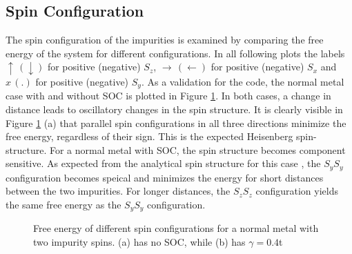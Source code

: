 \subsection{Spin Configuration}
The spin configuration of the impurities is examined by comparing the free energy of the system for different configurations.
In all following plots the labels $\uparrow \,(\downarrow)$ for positive (negative) $S_z$, $\rightarrow \, (\leftarrow)$ for positive (negative) $S_x$ and $x \, (.)$ for positive (negative) $S_y$. \newline
As a validation for the code, the normal metal case with and without SOC is plotted in Figure \ref{fig:spin_normal}.
In both cases, a change in distance leads to oscillatory changes in the spin structure. \newline
It is clearly visible in Figure \ref{fig:spin_normal} (a) that parallel spin configurations in all three directions minimize the free energy, regardless of their sign. 
This is the expected Heisenberg spin-structure. \newline
For a normal metal with SOC, the spin structure becomes component sensitive. 
As expected from the analytical spin structure for this case \cite{valizadeh_mohammad_m_magnetic_2017}, the $S_yS_y$ configuration becomes speical and minimizes the energy for short distances between the two impurities.
For longer distances, the $S_z S_z$ configuration yields the same free energy as the $S_yS_y$ configuration.
\begin{figure}[H]
    \centering
    \label{fig:spin_normal}
    \caption{Free energy of different spin configurations for a normal metal with two impurity spins. (a) has no SOC, while (b) has $\gamma=0.4$t }
\end{figure}

